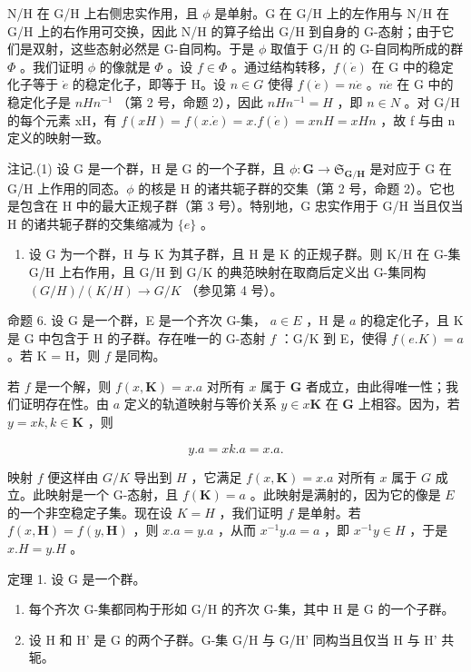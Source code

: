 N/H 在 G/H 上右侧忠实作用，且 \(\phi\) 是单射。G 在 G/H 上的左作用与 N/H 在 G/H 上的右作用可交换，因此 N/H 的算子给出 G/H 到自身的 G-态射；由于它们是双射，这些态射必然是 G-自同构。于是 \(\phi\) 取值于 G/H 的 G-自同构所成的群 \(\Phi\) 。我们证明 \(\phi\) 的像就是 \(\Phi\) 。设 \(f \in \Phi\) 。通过结构转移，\(f(\dot{e})\) 在 G 中的稳定化子等于 \(\dot{e}\) 的稳定化子，即等于 H。设 \(n \in G\) 使得 \(f(\dot{e}) = n\dot{e}\) 。\(n\dot{e}\) 在 G 中的稳定化子是 \(nHn^{-1}\) （第 2 号，命题 2），因此 \(nHn^{-1} = H\) ，即 \(n \in N\) 。对 G/H 的每个元素 xH，有 \(f(xH) = f(x.\dot{e}) = x.f(\dot{e}) = xnH = xHn\) ，故 f 与由 n 定义的映射一致。

注记.(1) 设 G 是一个群，H 是 G 的一个子群，且 \(\phi: \mathbf{G} \to \mathfrak{S}_{\mathbf{G}/\mathbf{H}}\) 是对应于 G 在 G/H 上作用的同态。\(\phi\) 的核是 H 的诸共轭子群的交集（第 2 号，命题 2）。它也是包含在 H 中的最大正规子群（第 3 号）。特别地，G 忠实作用于 G/H 当且仅当 H 的诸共轭子群的交集缩减为 \(\{e\}\) 。

\begin{enumerate}
\def\labelenumi{(\arabic{enumi})}
\setcounter{enumi}{1}
\tightlist
\item
  设 G 为一个群，H 与 K 为其子群，且 H 是 K 的正规子群。则 K/H 在 G-集 G/H 上右作用，且 G/H 到 G/K 的典范映射在取商后定义出 G-集同构 \((G/H)/(K/H) \rightarrow G/K\) （参见第 4 号）。
\end{enumerate}

命题 6. 设 G 是一个群，E 是一个齐次 G-集， \(a \in E\) ，H 是 \(a\) 的稳定化子，且 K 是 G 中包含于 H 的子群。存在唯一的 G-态射 \(f\) ：G/K 到 E，使得 \(f(e.K) = a\) 。若 K = H，则 \(f\) 是同构。

若 \(f\) 是一个解，则 \(f(x, \mathbf{K}) = x.a\) 对所有 \(x\) 属于 \(\mathbf{G}\) 者成立，由此得唯一性；我们证明存在性。由 \(a\) 定义的轨道映射与等价关系 \(y \in x\mathbf{K}\) 在 \(\mathbf{G}\) 上相容。因为，若 \(y = xk, k \in \mathbf{K}\) ，则

\[
y. a = x k. a = x. a.
\]

映射 \(f\) 便这样由 \(G / K\) 导出到 \(H\) ，它满足 \(f(x, \mathbf{K}) = x.a\) 对所有 \(x\) 属于 \(G\) 成立。此映射是一个 G-态射，且 \(f(\mathbf{K}) = a\) 。此映射是满射的，因为它的像是 \(E\) 的一个非空稳定子集。现在设 \(K = H\) ，我们证明 \(f\) 是单射。若 \(f(x, \mathbf{H}) = f(y, \mathbf{H})\) ，则 \(x.a = y.a\) ，从而 \(x^{-1}y.a = a\) ，即 \(x^{-1}y \in H\) ，于是 \(x.H = y.H\) 。

定理 1. 设 G 是一个群。

\begin{enumerate}
\def\labelenumi{(\alph{enumi})}
\item
  每个齐次 G-集都同构于形如 G/H 的齐次 G-集，其中 H 是 G 的一个子群。
\item
  设 H 和 H' 是 G 的两个子群。G-集 G/H 与 G/H' 同构当且仅当 H 与 H' 共轭。
\end{enumerate}

